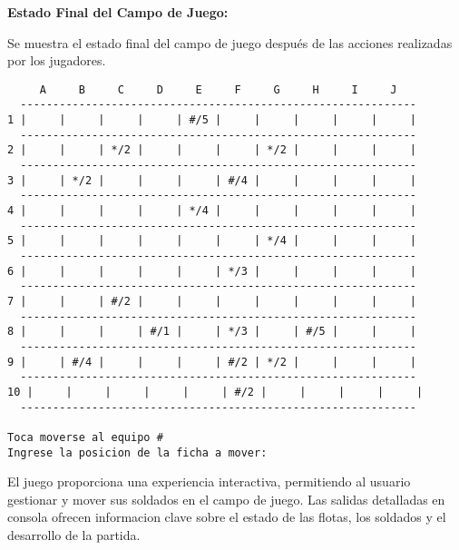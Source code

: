 \textbf{Estado Final del Campo de Juego:}

Se muestra el estado final del campo de juego después de las acciones realizadas por los jugadores.
\begin{lstlisting}
     A     B     C     D     E     F     G     H     I     J
  -------------------------------------------------------------
1 |     |     |     |     | #/5 |     |     |     |     |     |
  -------------------------------------------------------------
2 |     |     | */2 |     |     |     | */2 |     |     |     |
  -------------------------------------------------------------
3 |     | */2 |     |     |     | #/4 |     |     |     |     |
  -------------------------------------------------------------
4 |     |     |     |     | */4 |     |     |     |     |     |
  -------------------------------------------------------------
5 |     |     |     |     |     |     | */4 |     |     |     |
  -------------------------------------------------------------
6 |     |     |     |     |     | */3 |     |     |     |     |
  -------------------------------------------------------------
7 |     |     | #/2 |     |     |     |     |     |     |     |
  -------------------------------------------------------------
8 |     |     |     | #/1 |     | */3 |     | #/5 |     |     |
  -------------------------------------------------------------
9 |     | #/4 |     |     |     | #/2 | */2 |     |     |     |
  -------------------------------------------------------------
10 |     |     |     |     |     | #/2 |     |     |     |     |
  -------------------------------------------------------------

Toca moverse al equipo #
Ingrese la posicion de la ficha a mover:
\end{lstlisting}

El juego proporciona una experiencia interactiva, permitiendo al usuario gestionar y mover sus soldados en el campo de juego. Las salidas detalladas en consola ofrecen informacion clave sobre el estado de las flotas, los soldados y el desarrollo de la partida. 
